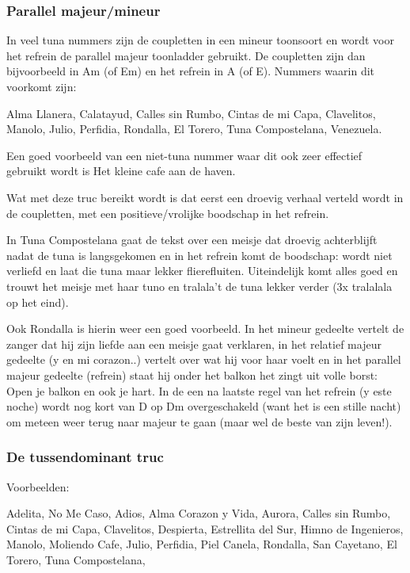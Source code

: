\subsubsection*{Parallel majeur/mineur}

In veel tuna nummers zijn de coupletten in een mineur toonsoort en wordt voor het refrein de parallel majeur toonladder gebruikt. De coupletten zijn dan bijvoorbeeld in Am (of Em) en het refrein in A (of E). Nummers waarin dit voorkomt zijn:

Alma Llanera, Calatayud, Calles sin Rumbo, Cintas de mi Capa, Clavelitos, Manolo, Julio, Perfidia, Rondalla, El Torero, Tuna Compostelana, Venezuela.

Een goed voorbeeld van een niet-tuna nummer waar dit ook zeer effectief gebruikt wordt is Het kleine cafe aan de haven.

Wat met deze truc bereikt wordt is dat eerst een droevig verhaal verteld wordt in de coupletten, met een positieve/vrolijke boodschap in het refrein.

In Tuna Compostelana gaat de tekst over een meisje dat droevig achterblijft nadat de tuna is langsgekomen en in het refrein komt de boodschap: wordt niet verliefd en laat die tuna maar lekker flierefluiten. Uiteindelijk komt alles goed en trouwt het meisje met haar tuno en tralala’t de tuna lekker verder (3x tralalala op het eind).

Ook Rondalla is hierin weer een goed voorbeeld. In het mineur gedeelte vertelt de zanger dat hij zijn liefde aan een meisje gaat verklaren, in het relatief majeur gedeelte (y en mi corazon..) vertelt over wat hij voor haar voelt en in het parallel majeur gedeelte (refrein) staat hij onder het balkon het zingt uit volle borst: Open je balkon en ook je hart. In de een na laatste regel van het refrein (y este noche) wordt nog kort van D op Dm overgeschakeld (want het is een stille nacht) om meteen weer terug naar majeur te gaan (maar wel de beste van zijn leven!).

\clearpage
\subsubsection*{De tussendominant truc}
Voorbeelden:

Adelita, No Me Caso, Adios, Alma Corazon y Vida, Aurora, Calles sin Rumbo, Cintas de mi Capa, Clavelitos, Despierta, Estrellita del Sur, Himno de Ingenieros, Manolo, Moliendo Cafe, Julio, Perfidia, Piel Canela, Rondalla, San Cayetano, El Torero, Tuna Compostelana, 
\begin{instrumental}{}
   \measure{}    
\end{instrumental}

